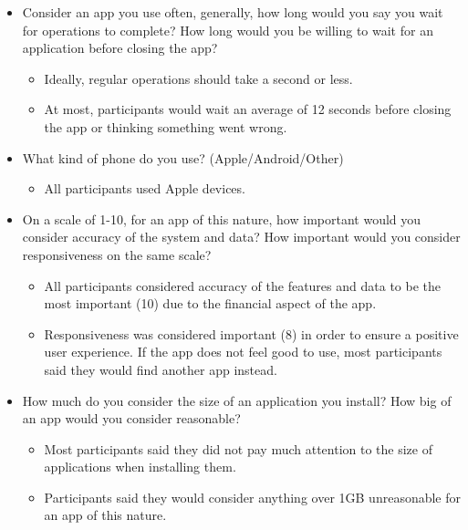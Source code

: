 \documentclass[12pt]{article}
\begin{document}
\begin{itemize}
  \item Consider an app you use often, generally, how long would you say you wait for operations
  to complete? How long would you be willing to wait for an application before closing the app?
    \begin{itemize}
      \item Ideally, regular operations should take a second or less.
      \item At most, participants would wait an average of 12 seconds before closing the app or
      thinking something went wrong.
    \end{itemize}
  \item What kind of phone do you use? (Apple/Android/Other)
    \begin{itemize}
      \item All participants used Apple devices.
    \end{itemize}
  \item On a scale of 1-10, for an app of this nature, how important would you consider accuracy
  of the system and data? How important would you consider responsiveness on the same scale?
    \begin{itemize}
      \item All participants considered accuracy of the features and data to be the most important (10) due
      to the financial aspect of the app.
      \item Responsiveness was considered important (8) in order to ensure a positive user experience. If the
      app does not feel good to use, most participants said they would find another app instead.
    \end{itemize}
  \item How much do you consider the size of an application you install? How big of an app would you
  consider reasonable?
    \begin{itemize}
      \item Most participants said they did not pay much attention to the size of applications when installing
      them.
      \item Participants said they would consider anything over 1GB unreasonable for an app of this nature.
    \end{itemize}
\end{itemize}
\end{document}
